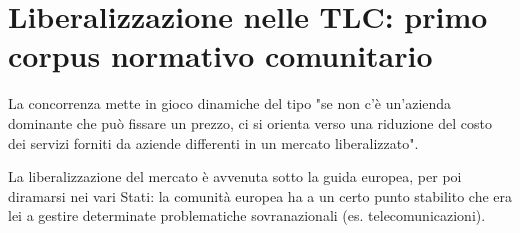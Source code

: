 \section{Liberalizzazione nelle TLC: primo corpus normativo comunitario}
La concorrenza mette in gioco dinamiche del tipo "se non c'è un'azienda dominante che può fissare un prezzo, ci si orienta verso una riduzione del costo dei servizi forniti da aziende differenti in un mercato liberalizzato". 

La liberalizzazione del mercato è avvenuta sotto la guida europea, per poi diramarsi nei vari Stati: la comunità europea ha a un certo punto stabilito che era lei a gestire determinate problematiche sovranazionali (es. telecomunicazioni).







